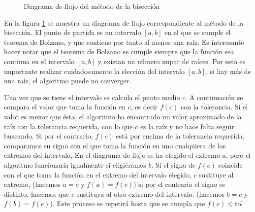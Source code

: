 \begin{figure}[h]
\centering
{}
\caption{Diagrama de flujo del método de la bisección}
\label{fig:dfbisec}
\end{figure}
En la figura \ref{fig:dfbisec} se muestra un diagrama de flujo correspondiente al método de la bisección. El punto de partida es un intervalo $[a,b]$ en el que se cumple el teorema de Bolzano, y que contiene por tanto al menos una raíz. Es interesante hacer notar que el teorema de Bolzano se cumple siempre que la función sea continua en el intervalo $[a,b]$ y existan un número impar de raíces. Por esto es importante realizar cuidadosamente la elección del intervalo $[a,b]$, si hay más de una raíz, el algoritmo puede no converger.

 Una vez que se tiene el intervalo se calcula el punto medio $c$. A continuación se compara el valor que toma la función en $c$, es decir $f(c)$ con la tolerancia. Si el valor es menor que ésta, el algoritmo ha encontrado un valor aproximado de la raíz con la tolerancia requerida, con lo que $c$ es la raíz y no hace falta seguir buscando. Si por el contrario, $f(c)$ está por encima de la tolerancia requerida, comparamos su signo con el que toma la función en uno cualquiera de los extremos del intervalo, En el diagrama de flujo se ha elegido el extremo $a$, pero el algoritmo funcionaría igualmente si eligiéramos $b$. Si el signo de $f(c)$ coincide con el que toma la función en el extremo del intervalo elegido, $c$ sustituye al extremo, (hacemos $a=c$ y $f(a)=f(c)$) si por el contrario el signo es distinto, hacemos que $c$ sustituya al otro extremo del intervalo. (hacemos $b=c$ y $f(b)=f(c)$). Este proceso se repetirá hasta que se cumpla que $f(c)\le \text{tol}$ 

